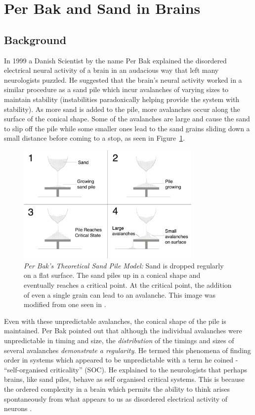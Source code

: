 \documentclass{book}
\begin{document}
\section{Per Bak and Sand in Brains}
\subsection{Background}
In 1999 a Danish Scientist by the name Per Bak explained the disordered electrical neural activity of a brain in an audacious way that left many neurologists puzzled.  He suggested that the brain's neural activity worked in a similar procedure as a sand pile which incur avalanches of varying sizes to maintain stability (instabilities paradoxically helping provide the system with stability). As more sand is added to the pile, more avalanches occur along the surface of the conical shape. Some of the avalanches are large and cause the sand to slip off the pile while some smaller ones lead to the sand grains sliding down a small distance before coming to a stop, as seen in Figure~\ref{fig:sandPileModel}. 

	\begin{figure}[h]
	\centering
	\includegraphics[width=0.8\textwidth]{Figures/Intro/SandPileFigs/sand_pile_model.png}
	\caption[Per Bak's Theoretical Sand Pile Model]{\textit{Per Bak's Theoretical Sand Pile Model:} Sand is dropped regularly on a flat surface. The sand piles up in a conical shape and eventually reaches a critical point. At the critical point, the addition of even a single grain can lead to an avalanche. This image was modified from one seen in \cite{IMGSandPile}.}
	\label{fig:sandPileModel}
\end{figure}

Even with these unpredictable avalanches, the conical shape of the pile is maintained. Per Bak pointed out that although the individual avalanches were unpredictable in timing and size, the \textit{distribution} of the timings and sizes of several avalanches \textit{demonstrate a regularity}. He termed this phenomena of finding order in systems which appeared to be unpredictable with a term he coined - ``self-organised criticality'' (SOC).  He explained to the neurologists that perhaps brains, like sand piles, behave as self organised critical systems. This is because the ordered complexity in a brain which permits the ability to think arises spontaneously from what appears to us as disordered electrical activity of neurons .
\end{document}
